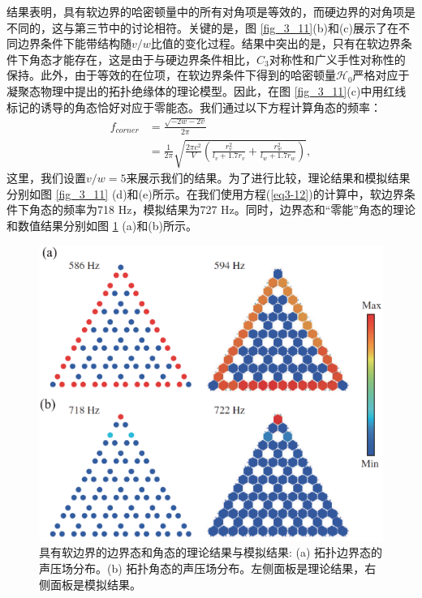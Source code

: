 结果表明，具有软边界的哈密顿量中的所有对角项是等效的，而硬边界的对角项是不同的，这与第三节中的讨论相符。关键的是，图 \ref{fig_3_11}(b)和(c)展示了在不同边界条件下能带结构随\(v/w\)比值的变化过程。结果中突出的是，只有在软边界条件下角态才能存在，这是由于与硬边界条件相比，\(C_3\)对称性和广义手性对称性的保持。此外，由于等效的在位项，在软边界条件下得到的哈密顿量\(\mathcal{H}_0\)严格对应于凝聚态物理中提出的拓扑绝缘体的理论模型。因此，在图 \ref{fig_3_11}(c)中用红线标记的诱导的角态恰好对应于零能态。我们通过以下方程计算角态的频率：
\begin{equation}\label{eq3-12}
  \begin{aligned}
  f_{corner} &= \frac{\sqrt{-2w - 2v}}{2\pi}\\
  &= \frac{1}{2\pi}\sqrt{\frac{2\pi c^2}{V}\left(\frac{r_v^2}{l_v + 1.7r_v}+\frac{r_w^2}{l_w + 1.7r_w}\right)},
  \end{aligned}
  \end{equation}
这里，我们设置\(v/w = 5\)来展示我们的结果。为了进行比较，理论结果和模拟结果分别如图 \ref{fig_3_11} (d)和(e)所示。在我们使用方程(\ref{eq3-12})的计算中，软边界条件下角态的频率为718 Hz，模拟结果为727 Hz。同时，边界态和“零能”角态的理论和数值结果分别如图 \ref{fig_3_12} (a)和(b)所示。

\begin{figure}[h!]
  \centering
  \includegraphics[width=1\textwidth]{images/fig3-12.eps} 
  \caption{具有软边界的边界态和角态的理论结果与模拟结果: (a) 拓扑边界态的声压场分布。(b) 拓扑角态的声压场分布。左侧面板是理论结果，右侧面板是模拟结果。}
  \label{fig_3_12}
\end{figure}

